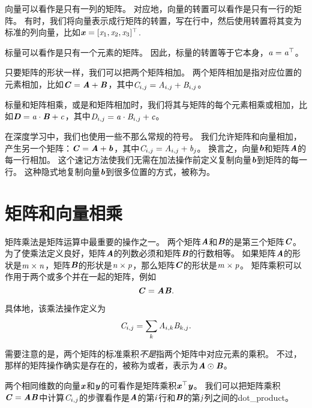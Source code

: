 向量可以看作是只有一列的矩阵。
对应地，向量的转置可以看作是只有一行的矩阵。
有时，我们将向量表示成行矩阵的转置，写在行中，然后使用转置将其变为标准的列向量，比如$\Vx=[\Sx_1, \Sx_2, \Sx_3]^\top$.


标量可以看作是只有一个元素的矩阵。
因此，标量的转置等于它本身，$\Sa=\Sa^\top$。


只要矩阵的形状一样，我们可以把两个矩阵相加。
两个矩阵相加是指对应位置的元素相加，比如$\MC=\MA+\MB$，其中$\SC_{i,j}= \SA_{i,j}+\SB_{i,j}$。


标量和矩阵相乘，或是和矩阵相加时，我们将其与矩阵的每个元素相乘或相加，比如$\MD = \Sa \cdot \MB + \Sc$，其中$\SD_{i,j} = \Sa\cdot  \SB_{i,j} + \Sc$。


在深度学习中，我们也使用一些不那么常规的符号。
我们允许矩阵和向量相加，产生另一个矩阵：$\MC=\MA + \Vb$，其中$\SC_{i,j}= \SA_{i,j} + \Sb_{j}$。
换言之，向量$\Vb$和矩阵$\MA$的每一行相加。
这个速记方法使我们无需在加法操作前定义复制向量$\Vb$到矩阵的每一行。
这种隐式地复制向量$\Vb$到很多位置的方式，被称为。




\section{矩阵和向量相乘}
\label{sec:multiplying_matrices_and_vectors}

矩阵乘法是矩阵运算中最重要的操作之一。
两个矩阵$\MA$和$\MB$的是第三个矩阵$\MC$。
为了使乘法定义良好，矩阵$\MA$的列数必须和矩阵$\MB$的行数相等。
如果矩阵$\MA$的形状是$\Sm \times \Sn$，矩阵$\MB$的形状是$\Sn\times \Sp$，那么矩阵$\MC$的形状是$\Sm\times \Sp$。
矩阵乘积可以作用于两个或多个并在一起的矩阵，例如
\begin{equation}
    \MC=\MA\MB.
\end{equation}


具体地，该乘法操作定义为
\begin{equation}
    \SC_{i,j}=\sum_k \SA_{i,k} \SB_{k,j}.
\end{equation}


需要注意的是，两个矩阵的标准乘积\emph{不是}指两个矩阵中对应元素的乘积。
不过，那样的矩阵操作确实是存在的，被称为或者，表示为$\MA\odot\MB$。


两个相同维数的向量$\Vx$和$\Vy$的可看作是矩阵乘积$\Vx^\top\Vy$。
我们可以把矩阵乘积$\MC=\MA\MB$中计算$\SC_{i,j}$的步骤看作是$\MA$的第$\Si$行和$\MB$的第$\Sj$列之间的\gls{dot_product}。


